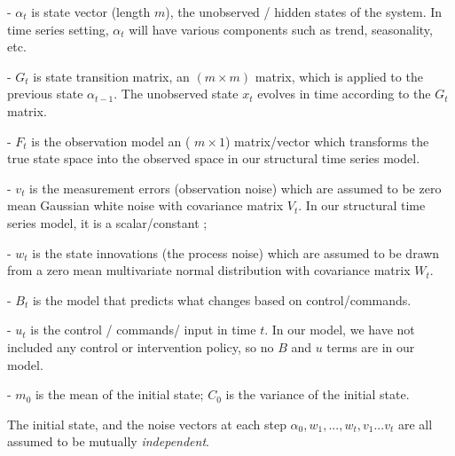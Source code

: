 -  $\alpha_t$ is state vector (length $m$), the unobserved / hidden states of the system. In time series setting, $\alpha_t$ will have various components such as trend, seasonality, etc.  







-  $G_t$ is state transition matrix, an $(m \times m)$ matrix, which is applied to the previous state $\alpha_{t-1}$. The unobserved state $x_t$ evolves in time according to the $G_t$ matrix. 







- $F_t$ is the observation model an ( $m \times 1$)  matrix/vector which transforms the true state space into the observed space in our structural time series model. 







- $v_t$ is the measurement errors (observation noise) which are assumed to be zero mean Gaussian white noise with covariance matrix $V_t$. In our structural time series model, it is a scalar/constant ;







- $w_t$ is the state innovations (the process noise) which are assumed to be drawn from a zero mean multivariate normal distribution with covariance matrix $W_t$.







- $B_t$ is the model that predicts what changes based on  control/commands.







- $u_t$ is the control / commands/ input  in time $t$. In our model, we have not included any control or intervention policy, so no $B$ and $u$ terms are in our model. 



- $m_{0}$ is the mean of the initial state; $C_{0}$ is the variance of the initial state.



The initial state, and the noise vectors at each step ${\alpha_0, w_1, ..., w_t, v_1 ... v_t}$ are all assumed to be mutually \textit{independent}.





